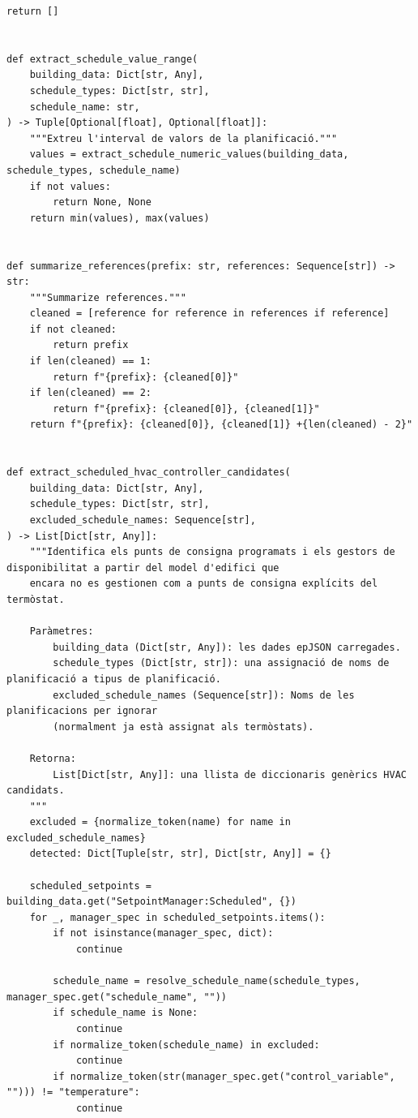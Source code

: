 \documentclass[10pt,a4paper]{article}
\begin{document}
\begin{lstlisting}[style=studioPython,caption={backend/afegir\_entorn\_analysis.py},label={lst:backend-afegir-entorn-analysis-py}]
    return []


def extract_schedule_value_range(
    building_data: Dict[str, Any],
    schedule_types: Dict[str, str],
    schedule_name: str,
) -> Tuple[Optional[float], Optional[float]]:
    """Extreu l'interval de valors de la planificació."""
    values = extract_schedule_numeric_values(building_data, schedule_types, schedule_name)
    if not values:
        return None, None
    return min(values), max(values)


def summarize_references(prefix: str, references: Sequence[str]) -> str:
    """Summarize references."""
    cleaned = [reference for reference in references if reference]
    if not cleaned:
        return prefix
    if len(cleaned) == 1:
        return f"{prefix}: {cleaned[0]}"
    if len(cleaned) == 2:
        return f"{prefix}: {cleaned[0]}, {cleaned[1]}"
    return f"{prefix}: {cleaned[0]}, {cleaned[1]} +{len(cleaned) - 2}"


def extract_scheduled_hvac_controller_candidates(
    building_data: Dict[str, Any],
    schedule_types: Dict[str, str],
    excluded_schedule_names: Sequence[str],
) -> List[Dict[str, Any]]:
    """Identifica els punts de consigna programats i els gestors de disponibilitat a partir del model d'edifici que
    encara no es gestionen com a punts de consigna explícits del termòstat.

    Paràmetres:
        building_data (Dict[str, Any]): les dades epJSON carregades.
        schedule_types (Dict[str, str]): una assignació de noms de planificació a tipus de planificació.
        excluded_schedule_names (Sequence[str]): Noms de les planificacions per ignorar
        (normalment ja està assignat als termòstats).

    Retorna:
        List[Dict[str, Any]]: una llista de diccionaris genèrics HVAC candidats.
    """
    excluded = {normalize_token(name) for name in excluded_schedule_names}
    detected: Dict[Tuple[str, str], Dict[str, Any]] = {}

    scheduled_setpoints = building_data.get("SetpointManager:Scheduled", {})
    for _, manager_spec in scheduled_setpoints.items():
        if not isinstance(manager_spec, dict):
            continue

        schedule_name = resolve_schedule_name(schedule_types, manager_spec.get("schedule_name", ""))
        if schedule_name is None:
            continue
        if normalize_token(schedule_name) in excluded:
            continue
        if normalize_token(str(manager_spec.get("control_variable", ""))) != "temperature":
            continue


\end{lstlisting}
\end{document}
